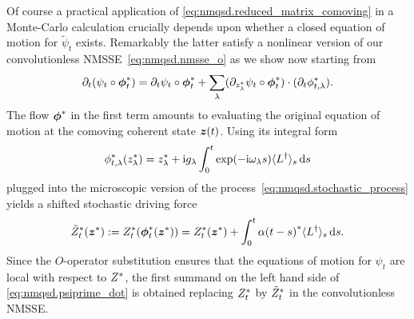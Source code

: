 Of course a practical application of \autoref{eq:nmqsd.reduced_matrix_comoving} in a Monte-Carlo calculation crucially depends upon whether a closed equation of motion for $\tilde\psi_t$ exists.
Remarkably the latter satisfy a nonlinear version of our convolutionless NMSSE~\ref{eq:nmqsd.nmsse_o} as we show now starting from
\begin{equation}
  \partial_t (\psi_t \circ {\boldsymbol{\phi}}^*_t) = \partial_t\psi_t \circ {\boldsymbol{\phi}}^*_t + \sum_\lambda (\partial_{{z}^*_\lambda} \psi_t \circ {\boldsymbol{\phi}}^*_t) \cdot (\partial_t {\phi}^*_{t, \lambda}).
  \label{eq:nmqsd.psiprime_dot}
\end{equation}
The flow ${\boldsymbol{\phi}}^*$ in the first term amounts to evaluating the original equation of motion at the comoving coherent state $\boldsymbol{z}(t)$.
Using its integral form
\begin{equation}
  \ccphitla(\cc z_\lambda) = \cc z_\lambda + \ii g_\lambda \int_0^t \exp(-\ii \omega_\lambda s) \qmean{\adj L}_s \dd s
  \label{eq:nmqsd.comoving_flow}
\end{equation}
plugged into the microscopic version of the process~\ref{eq:nmqsd.stochastic_process} yields a shifted stochastic driving force
\begin{equation}
  {\tilde Z}^*_t({\boldsymbol{z}}^*) := {Z}^*_t({\boldsymbol{\phi}}^*_t({\boldsymbol{z}}^*)) = {Z}^*_t({\boldsymbol{z}}^*) + \int_0^t {\alpha(t-s)}^* \langle L^\dagger \rangle_s \, \mathrm{d} s.
  \label{eq:stochastic_process_shiften}
\end{equation}
Since the $O$-operator substitution ensures that the equations of motion for $\psi_t$ are local with respect to ${Z}^*$, the first summand on the left hand side of \autoref{eq:nmqsd.psiprime_dot} is obtained replacing ${Z}^*_t$ by ${\tilde Z}^*_t$ in the convolutionless NMSSE.

